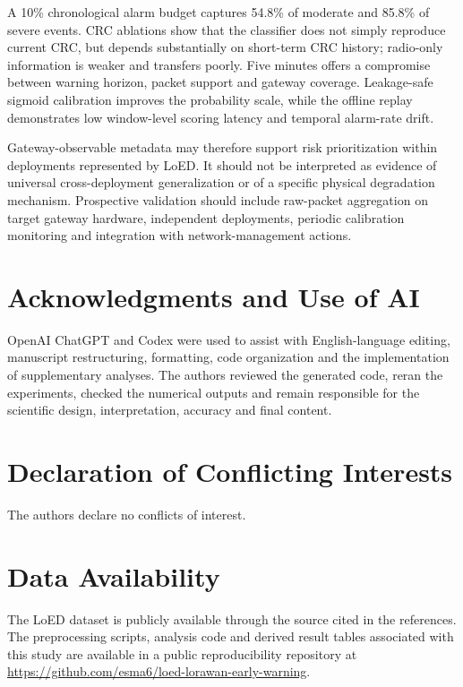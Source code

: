 \documentclass{jot}
\begin{document}
A 10\% chronological alarm budget captures 54.8\% of moderate and 85.8\% of severe events. CRC ablations show that the classifier does not simply reproduce current CRC, but depends substantially on short-term CRC history; radio-only information is weaker and transfers poorly. Five minutes offers a compromise between warning horizon, packet support and gateway coverage. Leakage-safe sigmoid calibration improves the probability scale, while the offline replay demonstrates low window-level scoring latency and temporal alarm-rate drift.

Gateway-observable metadata may therefore support risk prioritization within deployments represented by LoED. It should not be interpreted as evidence of universal cross-deployment generalization or of a specific physical degradation mechanism. Prospective validation should include raw-packet aggregation on target gateway hardware, independent deployments, periodic calibration monitoring and integration with network-management actions.

\section*{Acknowledgments and Use of AI}
OpenAI ChatGPT and Codex were used to assist with English-language editing, manuscript restructuring, formatting, code organization and the implementation of supplementary analyses. The authors reviewed the generated code, reran the experiments, checked the numerical outputs and remain responsible for the scientific design, interpretation, accuracy and final content.

\section*{Declaration of Conflicting Interests}
The authors declare no conflicts of interest.

\section*{Data Availability}
The LoED dataset is publicly available through the source cited in the references. The preprocessing scripts, analysis code and derived result tables associated with this study are available in a public reproducibility repository at \url{https://github.com/esma6/loed-lorawan-early-warning}.
\end{document}
